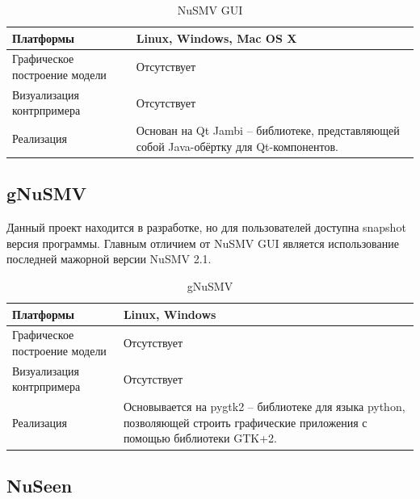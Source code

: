 

\begin{table}[ht]
	\caption{NuSMV GUI}\label{tab:nusmv_gui}
	\centering
	\begin{tabular}{|m{2.5 cm}|m{7.5 cm}|}
		\hline
		Платформы & Linux, Windows, Mac OS X \\
		\hline
		Графическое построение модели &Отсутствует \\
		\hline
		Визуализация контрпримера & Отсутствует \\
		\hline
		Реализация & Основан на Qt Jambi – библиотеке, представляющей собой Java-обёртку для Qt-компонентов.\\
		\hline
	\end{tabular}
\end{table}

\subsection{gNuSMV}

Данный проект находится в разработке, но для пользователей доступна snapshot версия программы. Главным отличием от NuSMV GUI является использование последней мажорной версии NuSMV 2.1. 




\begin{table}[ht]
	\caption{gNuSMV}\label{tab:gnusmv}
	\centering
	\begin{tabular}{|m{2.5 cm}|m{7.5 cm}|}
		\hline
		Платформы & Linux, Windows \\
		\hline
		Графическое построение модели &Отсутствует \\
		\hline
		Визуализация контрпримера & Отсутствует \\
		\hline
		Реализация & Основывается на pygtk2 – библиотеке для языка python, позволяющей строить графические приложения с помощью библиотеки GTK+2.\\
		\hline
	\end{tabular}
\end{table}

\subsection{NuSeen}


